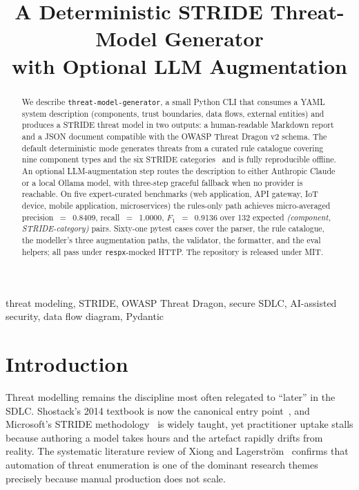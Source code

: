 \documentclass[conference]{IEEEtran}
\begin{document}
\title{A Deterministic STRIDE Threat-Model Generator\\with Optional LLM Augmentation}

\author{
}

\maketitle

\begin{abstract}
We describe \texttt{threat-model-generator}, a small Python CLI that
consumes a YAML system description (components, trust boundaries,
data flows, external entities) and produces a STRIDE threat model in
two outputs: a human-readable Markdown report and a JSON document
compatible with the OWASP Threat Dragon v2 schema. The default
deterministic mode generates threats from a curated rule catalogue
covering nine component types and the six STRIDE
categories~\cite{shostack2014threat,hernan2006stride} and is fully
reproducible offline. An optional LLM-augmentation step routes the
description to either Anthropic Claude or a local Ollama model, with
three-step graceful fallback when no provider is reachable. On five
expert-curated benchmarks (web application, API gateway, IoT device,
mobile application, microservices) the rules-only path achieves
micro-averaged precision~$=$~0.8409, recall~$=$~1.0000,
$F_1$~$=$~0.9136 over 132 expected
\emph{(component, STRIDE-category)} pairs. Sixty-one pytest cases
cover the parser, the rule catalogue, the modeller's three
augmentation paths, the validator, the formatter, and the eval
helpers; all pass under \texttt{respx}-mocked HTTP. The repository is
released under MIT.
\end{abstract}

\begin{IEEEkeywords}
threat modeling, STRIDE, OWASP Threat Dragon, secure SDLC,
AI-assisted security, data flow diagram, Pydantic
\end{IEEEkeywords}

\section{Introduction}

Threat modelling remains the discipline most often relegated to
``later'' in the SDLC. Shostack's 2014 textbook is now
the canonical entry point~\cite{shostack2014threat}, and Microsoft's
STRIDE methodology~\cite{hernan2006stride} is widely taught, yet
practitioner uptake stalls because authoring a model takes hours and
the artefact rapidly drifts from reality. The systematic literature
review of Xiong and Lagerstr\"om~\cite{xiong2019threat} confirms
that automation of threat enumeration is one of the dominant
research themes precisely because manual production does not scale.
\end{document}

